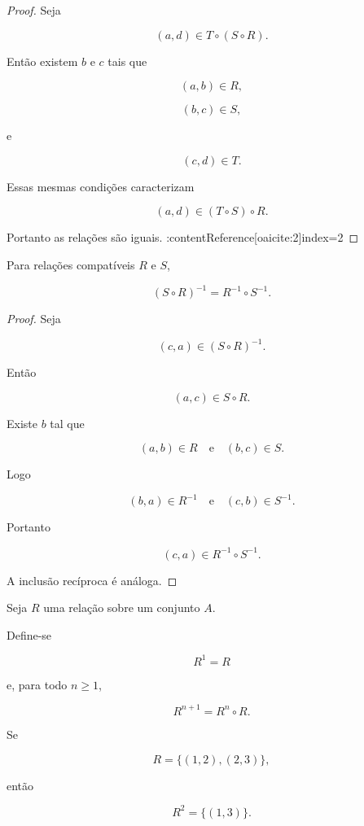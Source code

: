 \documentclass[../../main]{subfiles}
\begin{document}
\begin{proof}

	Seja

	\[
		(a,d)\in T\circ(S\circ R).
	\]

	Então existem \(b\) e \(c\) tais que

	\[
		(a,b)\in R,
	\]

	\[
		(b,c)\in S,
	\]

	e

	\[
		(c,d)\in T.
	\]

	Essas mesmas condições caracterizam

	\[
		(a,d)\in (T\circ S)\circ R.
	\]

	Portanto as relações são iguais. :contentReference[oaicite:2]{index=2}

\end{proof}

\begin{prop}
	\label{prop:matematica:relacoes:operacoes:inversa-composicao}

	Para relações compatíveis \(R\) e \(S\),

	\[
		(S\circ R)^{-1}
		=
		R^{-1}\circ S^{-1}.
	\]

\end{prop}

\begin{proof}

	Seja

	\[
		(c,a)\in (S\circ R)^{-1}.
	\]

	Então

	\[
		(a,c)\in S\circ R.
	\]

	Existe \(b\) tal que

	\[
		(a,b)\in R
		\quad\text{e}\quad
		(b,c)\in S.
	\]

	Logo

	\[
		(b,a)\in R^{-1}
		\quad\text{e}\quad
		(c,b)\in S^{-1}.
	\]

	Portanto

	\[
		(c,a)\in R^{-1}\circ S^{-1}.
	\]

	A inclusão recíproca é análoga.

\end{proof}

\begin{defn}
	\label{def:matematica:relacoes:operacoes:potencia}

	Seja \(R\) uma relação sobre um conjunto \(A\).

	Define-se

	\[
		R^1 = R
	\]

	e, para todo \(n\ge 1\),

	\[
		R^{n+1}
		=
		R^n \circ R.
	\]

\end{defn}

\begin{ex}

	Se

	\[
		R
		=
		\{
		(1,2),
		(2,3)
		\},
	\]

	então

	\[
		R^2
		=
		\{
		(1,3)
		\}.
	\]

\end{ex}
\end{document}
